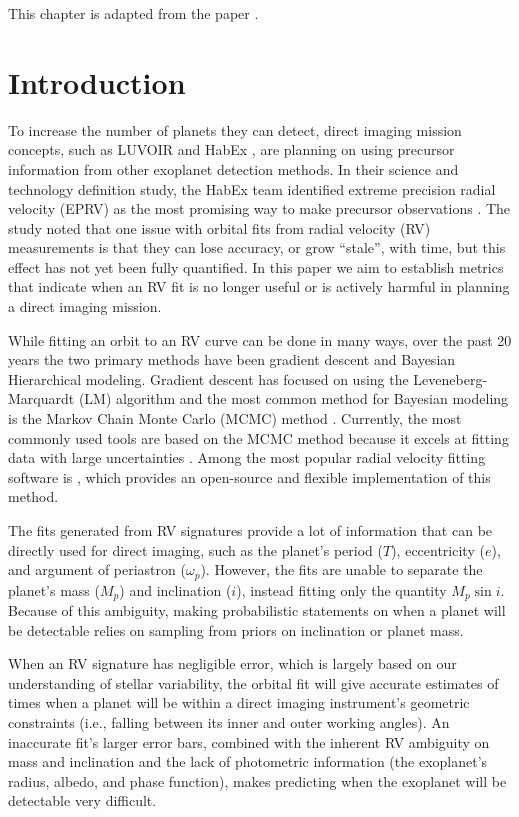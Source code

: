 This chapter is adapted from the paper \citet{spohnSchedulingDirect2022}.
\section{Introduction}%
To increase the number of planets they can detect, direct imaging mission concepts, such as LUVOIR
\citep{TheLUVOIRTeam2019} and HabEx \citep{gaudiHabitableExoplanetObservatory2020}, are planning on using precursor information
from other exoplanet detection methods.  In their science and technology definition study, the HabEx
team identified extreme precision radial velocity (EPRV) as the most promising way to make precursor
observations  \citep{gaudiHabitableExoplanetObservatory2020}.  The study noted that one issue with orbital fits from radial velocity
(RV) measurements is that they can lose accuracy, or grow ``stale'', with time, but this effect has
not yet been fully quantified.  In this paper we aim to establish metrics that indicate when an RV
fit is no longer useful or is actively harmful in planning a direct imaging mission.

While fitting an orbit to an RV curve can be done in many ways, over the past 20 years the two
primary methods have been gradient descent and Bayesian Hierarchical modeling.  Gradient descent has
focused on using the Leveneberg-Marquardt (LM) algorithm \citep{Levenberg1943b, Marquardt1963b} and
the most common method for Bayesian modeling is the Markov Chain Monte Carlo (MCMC) method
\citep{Metropolis1953, Hastings1970}.  Currently, the most commonly used tools are based on
the MCMC method because it excels at fitting data with large uncertainties \citep{Wright2009b}.
Among the most popular radial velocity fitting software is  \citep{fultonRadvelRadialVelocity2018}, which provides an
open-source and flexible implementation of this method.

The fits generated from RV signatures provide a lot of information that can be directly used for direct
imaging, such as the planet's period ($T$), eccentricity ($e$), and argument of
periastron ($\omega_p$).  However, the fits are unable to separate the planet's mass ($M_p$) and
inclination ($i$), instead fitting only the quantity $M_{p}\sin{i}$.  Because of this ambiguity,
making probabilistic statements on when a planet will be detectable relies on sampling from priors
on inclination or planet mass.

When an RV signature has negligible error, which is largely based on our understanding of stellar
variability, the orbital fit will give accurate estimates of times when a planet will be within a
direct imaging instrument's geometric constraints (i.e., falling between its inner and outer working
angles). An inaccurate fit's larger error bars, combined with the inherent RV ambiguity on mass and
inclination and the lack of photometric information (the exoplanet's radius, albedo, and phase
function), makes predicting when the exoplanet will be detectable very difficult.

